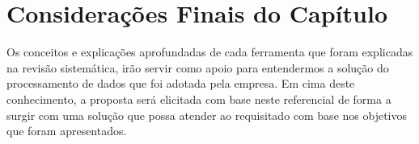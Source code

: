     \section{Considerações Finais do Capítulo}

        Os conceitos e explicações aprofundadas de cada ferramenta que foram explicadas na revisão sistemática, irão servir como
        apoio para entendermos a solução do processamento de dados que foi adotada pela empresa. Em cima deste conhecimento,
        a proposta será elicitada com base neste referencial de forma a surgir com uma solução que possa atender ao requisitado com
        base nos objetivos que foram apresentados.